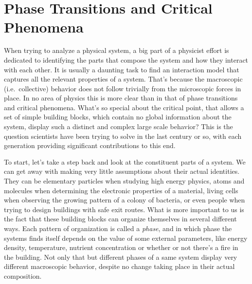 \chapter{Phase Transitions and Critical Phenomena}
\label{ch:crit}

When trying to analyze a physical system, a big part of a physicist effort is
dedicated to identifying the parts that compose the system and how they
interact with each other. It is usually a daunting task to find an interaction
model that captures all the relevant properties of a system. That's because the
macroscopic (i.e.\ collective) behavior does not follow trivially from the
microscopic forces in place. In no area of physics this is more clear than in
that of phase transitions and critical phenomena. What's so special about the
critical point, that allows a set of simple building blocks, which contain no
global information about the system, display such a distinct and complex large
scale behavior? This is the question scientists have been trying to solve in
the last century or so, with each generation providing significant
contributions to this end.


To start, let's take a step back and look at the constituent parts of a system.
We can get away with making very little assumptions about their actual
identities. They can be elementary particles when studying high energy physics,
atoms and molecules when determining the electronic properties of a material,
living cells when observing the growing pattern of a colony of bacteria, or
even people when trying to design buildings with safe exit routes. What is more
important to us is the fact that these building blocks can organize themselves
in several different ways. Each pattern of organization is called a
\textit{phase}, and in which phase the systems finds itself depends on the
value of some external parameters, like energy density, temperature, nutrient
concentration or whether or not there's a fire in the building. Not only that
but different phases of a same system display very different macroscopic
behavior, despite no change taking place in their actual composition.

